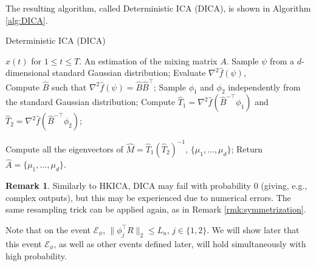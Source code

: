 \documentclass{article}
\newcommand{\Ephi}{\mathcal{E}_{\phi}}
\newcommand{\cN}{\cal{N}}
\theoremstyle{definition}
\newtheorem{remark}[lemma]{Remark}
\begin{document}
The resulting algorithm, called Deterministic ICA (DICA), is shown in Algorithm \ref{alg:DICA}. 
\begin{algorithm}
\caption{Deterministic ICA (DICA)}
\label{alg:DICA}
\begin{algorithmic}[1]
\INPUT $x(t)$ for $1\le t \le T$. 
\OUTPUT An estimation of the mixing matrix $A$. 
\STATE Sample $\psi$ from a $d$-dimensional standard Gaussian distribution;
\STATE Evaluate $\nabla^2\hat{f}(\psi)$, \\
\STATE Compute $\hat{B}$ such that $\nabla^2\hat{f}(\psi) = \hat{B}\hat{B}^{\top}$;
\STATE Sample $\phi_1$ and $\phi_2$ independently from the standard Gaussian distribution;
\STATE Compute $\hat{T}_1 =\nabla^2\hat{f}(\hat{B}^{-\top}\phi_1)$ and  $\hat{T}_2 =\nabla^2\hat{f}(\hat{B}^{-\top}\phi_2)$;

\STATE Compute all the eigenvectors of $\hat{M} = \hat{T}_1\left(\hat{T}_2\right)^{-1}$, $\{\mu_1,\ldots,\mu_d\}$;
\STATE Return $\hat{A} = \{\mu_1,\ldots,\mu_d\}$.
\end{algorithmic}
\end{algorithm}
\begin{remark}
Similarly to HKICA, DICA may fail with probability 0 (giving, e.g., complex outputs), but this may be experienced due to numerical errors.
The same resampling trick can be applied again, as in Remark \ref{rmk:symmetrization}. 
\end{remark}
Note that on the event $\Ephi$, $\|\phi_j^{\top}R\|_2\le L_u$, $j\in\{1,2\}$. 
We will show later that this event $\Ephi$, as well as other events defined later, will hold simultaneously with high probability.
\end{document}
